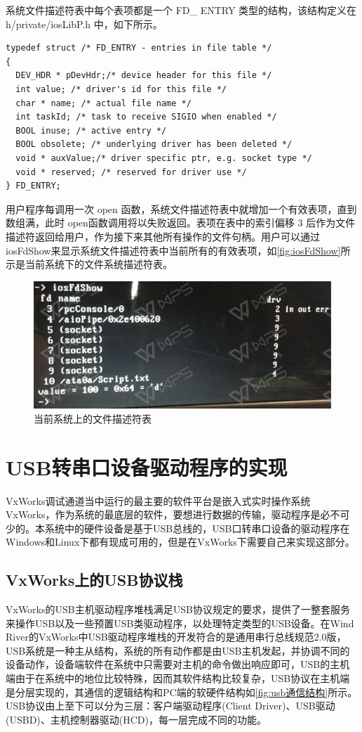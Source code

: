 	系统文件描述符表中每个表项都是一个 FD\_ ENTRY 类型的结构，该结构定义在h/private/iosLibP.h 中，如下所示。
\lstset{language=C}
\begin{lstlisting}
typedef struct /* FD_ENTRY - entries in file table */ 
{ 
  DEV_HDR * pDevHdr;/* device header for this file */ 
  int value; /* driver's id for this file */ 
  char * name; /* actual file name */ 
  int taskId; /* task to receive SIGIO when enabled */ 
  BOOL inuse; /* active entry */ 
  BOOL obsolete; /* underlying driver has been deleted */ 
  void * auxValue;/* driver specific ptr, e.g. socket type */ 
  void * reserved; /* reserved for driver use */ 
} FD_ENTRY; 
\end{lstlisting}

用户程序每调用一次 open 函数，系统文件描述符表中就增加一个有效表项，直到数组满，此时 open函数调用将以失败返回。表项在表中的索引偏移 3 后作为文件描述符返回给用户，作为接下来其他所有操作的文件句柄。用户可以通过iosFdShow来显示系统文件描述符表中当前所有的有效表项，如\autoref{fig:iosFdShow}所示是当前系统下的文件系统描述符表。
\begin{figure}[!h]
\centering
\includegraphics[width=.9\textwidth]{./graphics/iosFdShow.pdf}
\caption{当前系统上的文件描述符表}\label{fig:iosFdShow}
\end{figure}

\section{USB转串口设备驱动程序的实现}
	VxWorks调试通道当中运行的最主要的软件平台是嵌入式实时操作系统VxWorks，作为系统的最底层的软件，要想进行数据的传输，驱动程序是必不可少的。本系统中的硬件设备是基于USB总线的，USB口转串口设备的驱动程序在Windows和Linux下都有现成可用的，但是在VxWorks下需要自己来实现这部分。
	
\subsection{VxWorks上的USB协议栈}
	VxWorks的USB主机驱动程序堆栈满足USB协议规定的要求，提供了一整套服务来操作USB以及一些预置USB类驱动程序，以处理特定类型的USB设备。在Wind River的VxWorks中USB驱动程序堆栈的开发符合的是通用串行总线规范2.0版，USB系统是一种主从结构，系统的所有动作都是由USB主机发起，并协调不同的设备动作，设备端软件在系统中只需要对主机的命令做出响应即可，USB的主机端由于在系统中的地位比较特殊，因而其软件结构比较复杂，USB协议在主机端是分层实现的，其通信的逻辑结构和PC端的软硬件结构如\autoref{fig:usb通信结构}所示。USB协议由上至下可以分为三层：客户端驱动程序(Client Driver)、USB驱动(USBD)、主机控制器驱动(HCD)，每一层完成不同的功能。

